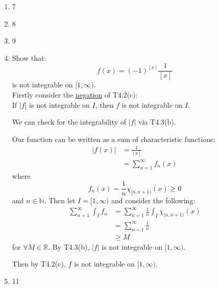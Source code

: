 \begin{enumerate}[resume]
    \newpage

    \item 7
    \item 8
    \item 9
    
    \newpage

    \item Show that:
    $$f(x)=(-1)^{[x]}\frac{1}{[x]}$$
    is not integrable on $[1,\infty)$. \\

    Firstly consider the \underline{negation}
    of T4.2(c): \\
    If $|f|$ is not integrable on $I$,
    then $f$ is not integrable on $I$.

    We can check for the integrability of $|f|$
    via T4.3(b).

    Our function can be written as a sum
    of characteristic functions:
    \begin{align*}
        |f(x)|
        &=\frac{1}{[x]} \\
        &=\sum_{n=1}^{\infty}f_n(x)
    \end{align*}
    where
    $$f_n(x)=\frac{1}{n}\chi_{[n,n+1)}(x)\geq0$$
    and $n\in\mathbb{N}$. Then let $I=[1,\infty)$ and consider the following:
    \begin{align*}
        \sum_{n=1}^{\infty}\int_I f_n
        &=\sum_{n=1}^{\infty}\frac{1}{n}
        \int_I\chi_{[n,n+1)}(x) \\
        &=\sum_{n=1}^{\infty}\frac{1}{n} \\
        &\geq M
    \end{align*}
    for $\forall M\in\mathbb{R}$. 
    By T4.3(b), $|f|$
    is not integrable on $[1,\infty)$.

    Then by T4.2(c), $f$ is not integrable
    on $[1,\infty)$.

    \newpage

    \item 11
\end{enumerate}
